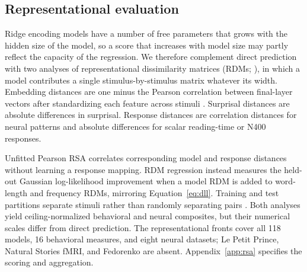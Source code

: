\subsection{Representational evaluation}
\label{sec:design-rsa}

Ridge encoding models have a number of free parameters that grows with the hidden size of the model, so a score that increases with model size may partly reflect the capacity of the regression. We therefore complement direct prediction with two analyses of representational dissimilarity matrices (RDMs; \citealp{kriegeskorte2008rsa}), in which a model contributes a single stimulus-by-stimulus matrix whatever its width. Embedding distances are one minus the Pearson correlation between final-layer vectors after standardizing each feature across stimuli \citep{timkey2021allbark}. Surprisal distances are absolute differences in surprisal. Response distances are correlation distances for neural patterns and absolute differences for scalar reading-time or N400 responses.

Unfitted Pearson RSA correlates corresponding model and response distances without learning a response mapping. RDM regression instead measures the held-out Gaussian log-likelihood improvement when a model RDM is added to word-length and frequency RDMs, mirroring Equation~\ref{eq:dll}. Training and test partitions separate stimuli rather than randomly separating pairs \citep{schutt2023statistical}. Both analyses yield ceiling-normalized behavioral and neural composites, but their numerical scales differ from direct prediction. The representational fronts cover all 118 models, 16 behavioral measures, and eight neural datasets; Le Petit Prince, Natural Stories fMRI, and Fedorenko are absent. Appendix~\ref{app:rsa} specifies the scoring and aggregation.
